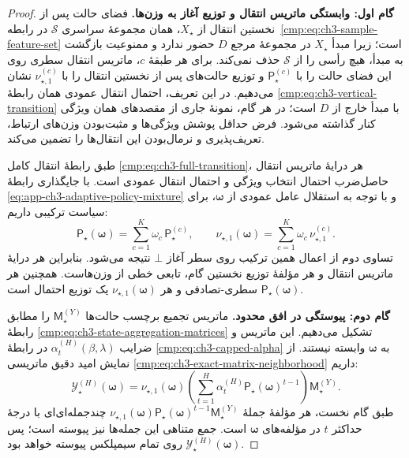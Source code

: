 \begin{proof}
\textbf{گام اول: وابستگی ماتریس انتقال و توزیع آغاز به وزن‌ها.}
فضای حالت پس از نخستین انتقال از $X_\star$، همان مجموعهٔ
سراسری $\mathcal S$ در
رابطه~\eqref{cmp:eq:ch3-sample-feature-set} است؛
زیرا مبدأ $X_\star$ در مجموعهٔ مرجع $D$ حضور ندارد
و ممنوعیت بازگشت به مبدأ، هیچ رأسی را از $\mathcal S$
حذف نمی‌کند. برای هر طبقهٔ $c$، ماتریس انتقال سطری
روی این فضای حالت
را با $\mathsf P_\star^{(c)}$ و توزیع حالت‌های پس از
نخستین انتقال را با $\nu_{\star,1}^{(c)}$ نشان می‌دهیم.
در این تعریف، احتمال انتقال عمودی همان رابطهٔ
\eqref{cmp:eq:ch3-vertical-transition} با مبدأ خارج از $D$
است؛ در هر گام، نمونهٔ جاری از مقصدهای همان ویژگی کنار گذاشته
می‌شود. فرض حداقل پوشش ویژگی‌ها و مثبت‌بودن وزن‌های ارتباط،
تعریف‌پذیری و نرمال‌بودن این انتقال‌ها را تضمین می‌کند.

طبق رابطهٔ انتقال کامل \eqref{cmp:eq:ch3-full-transition}،
هر درایهٔ ماتریس انتقال حاصل‌ضرب احتمال انتخاب ویژگی و
احتمال انتقال عمودی است. با جایگذاری
رابطهٔ \eqref{eq:app-ch3-adaptive-policy-mixture}
و با توجه به استقلال عامل عمودی از $\boldsymbol{\omega}$،
برای سیاست ترکیبی داریم:
\begin{equation}\label{eq:app-ch3-adaptive-policy-matrix-affine}
\boxed{
\mathsf P_\star(\boldsymbol{\omega})
=\sum_{c=1}^{K}\omega_c\,\mathsf P_\star^{(c)},
\qquad
\nu_{\star,1}(\boldsymbol{\omega})
=\sum_{c=1}^{K}\omega_c\,\nu_{\star,1}^{(c)}.
}
\end{equation}
تساوی دوم از اعمال همین ترکیب روی سطر آغاز $\bot$
نتیجه می‌شود. بنابراین هر درایهٔ ماتریس انتقال و هر
مؤلفهٔ توزیع نخستین گام، تابعی خطی از وزن‌هاست.
همچنین هر $\mathsf P_\star(\boldsymbol{\omega})$
سطری-تصادفی و هر $\nu_{\star,1}(\boldsymbol{\omega})$
یک توزیع احتمال است.

\textbf{گام دوم: پیوستگی در افق محدود.}
ماتریس تجمیع برچسب حالت‌ها
$\mathsf M_\star^{(Y)}$ را مطابق
رابطهٔ \eqref{cmp:eq:ch3-state-aggregation-matrices}
تشکیل می‌دهیم. این ماتریس و ضرایب
$\alpha_t^{(H)}(\beta,\lambda)$
در رابطهٔ \eqref{cmp:eq:ch3-capped-alpha}
به $\boldsymbol{\omega}$ وابسته نیستند.
از نمایش امید دقیق ماتریسی
\eqref{cmp:eq:ch3-exact-matrix-neighborhood} داریم:
\begin{equation}\label{eq:app-ch3-adaptive-policy-capped-output}
\boxed{
\mathscr Y_\star^{(H)}(\boldsymbol{\omega})
=\nu_{\star,1}(\boldsymbol{\omega})
\left(\sum_{t=1}^{H}\alpha_t^{(H)}
\mathsf P_\star(\boldsymbol{\omega})^{t-1}\right)
\mathsf M_\star^{(Y)}.
}
\end{equation}
طبق گام نخست، هر مؤلفهٔ جملهٔ
$\nu_{\star,1}(\boldsymbol{\omega})
\mathsf P_\star(\boldsymbol{\omega})^{t-1}
\mathsf M_\star^{(Y)}$
چندجمله‌ای‌ای با درجهٔ حداکثر $t$ در مؤلفه‌های
$\boldsymbol{\omega}$ است. جمع متناهی این جمله‌ها
نیز پیوسته است؛ پس
$\mathscr Y_\star^{(H)}(\boldsymbol{\omega})$
روی تمام سیمپلکس پیوسته خواهد بود.


\end{proof}
